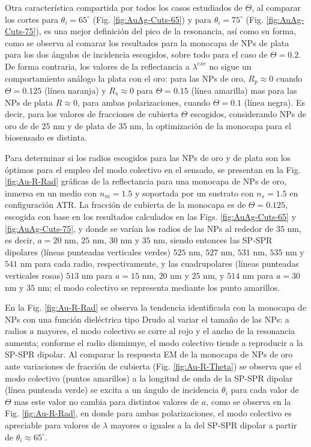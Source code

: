 Otra característica compartida por todos los casos estudiados de $\Theta$, al comparar los cortes para $\theta_i=65^\circ$ (Fig. \ref{fig:AuAg-Cuts-65}) y para $\theta_i=75^\circ$ (Fig. \ref{fig:AuAg-Cuts-75}), es una mejor definición del pico de la resonancia, así como su forma, como se observa al comarar los resultados para la monocapa de NPs de plata para los dos ángulos de incidencia escogidos, sobre todo para el caso de $\Theta=0.2$. De forma contraria, los valores de la reflectancia a $\lambda^{exc}$ no sigue un comportamiento análogo la plata con el oro: para las NPs de oro, $R_p\approx 0$ cuando $\Theta=0.125$ (línea naranja) y $R_s\approx 0$ para $\Theta=0.15$ (línea amarilla) mas para las NPs de plata $R\approx 0$, para ambas polarizaciones, cuando $\Theta=0.1$ (línea negra). Es decir, para los valores de fracciones de cubierta $\Theta$ escogidos, considerando NPs de oro de de $25$ nm y de plata de $35$ nm, la optimización de la monocapa para el biosensado es distinta.

Para determinar si los radios escogidos para las NPs de oro y de plata son los óptimos para el empleo del modo colectivo en el sensado, se presentan en la Fig. \ref{fig:Au-R-Rad}	gráficas de la reflectancia para una monocapa de NPs de oro, inmersa en un medio con $n_m=1.5$ y soportada por un sustrato con $n_s=1.5$ en configuración ATR. La fracción de cubierta de la monocapa es de $\Theta=0.125$, escogida con base en los resultados calculados en las Figs. \ref{fig:AuAg-Cuts-65} y \ref{fig:AuAg-Cuts-75}, y donde se varían los radios de las NPs al rededor de $35$ nm, es decir, $a=20$ nm, $25$ nm, $30$ nm y $35$ nm, siendo entonces las SP-SPR dipolares (líneas punteadas verticales verdes) $525$ nm, $527$ nm, $531$ nm, $535$ nm y $541$ nm para cada radio, respectivamente, y las cuadrupolares (líneas punteadas verticales rosas) $513$ nm para $a=15$ nm, $20$ nm y $25$ nm, y $514$ nm para $a=30$ nm y $35$ nm; el modo colectivo se representa mediante los punto amarillos.

En la Fig. \ref{fig:Au-R-Rad} se observa la tendencia identificada con la monocapa de NPs con una función dieléctrica tipo Drudo al variar el tamaño de las NPs: a radios $a$ mayores, el modo colectivo se corre al rojo y el ancho de la resonancia aumenta; conforme el radio disminuye, el modo colectivo tiende a reproducir a la SP-SPR dipolar. Al comparar la respuesta EM de la monocapa de NPs de oro ante variaciones de fracción de cubierta (Fig. \ref{fig:Au-R-Theta})  se observa que el modo colectivo (puntos amarillos) a la longitud de onda de la SP-SPR dipolar (línea punteada verde) se excita a un ángulo de incidencia $\theta_i$ para cada valor de $\Theta$ mas este valor no cambia para distintos valores de $a$, como se observa en la Fig. \ref{fig:Au-R-Rad}, en donde para ambas polarizaciones, el modo colectivo es apreciable para valores de $\lambda$ mayores o iguales a la del SP-SPR dipolar a partir de $\theta_i\approx 65^\circ$.

